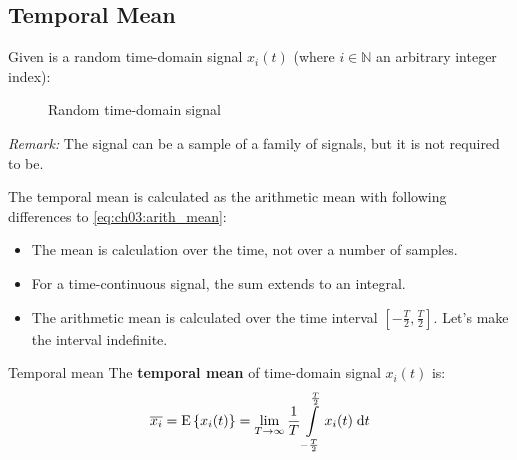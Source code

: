 \begin{refsection}
\subsection{Temporal Mean}

Given is a random time-domain signal $x_i(t)$ (where $i \in \mathbb{N}$ an arbitrary integer index):

\begin{figure}[H]
	\centering
	\caption{Random time-domain signal}
\end{figure}

\textit{Remark:} The signal can be a sample of a family of signals, but it is not required to be.

The temporal mean is calculated as the arithmetic mean with following differences to \eqref{eq:ch03:arith_mean}:
\begin{itemize}
	\item The mean is calculation over the time, not over a number of samples.
	\item For a time-continuous signal, the sum extends to an integral.
	\item The arithmetic mean is calculated over the time interval $[-\frac{T}{2}, \frac{T}{2}]$. Let's make the interval indefinite.
\end{itemize}

\begin{definition}{Temporal mean}
	The  \textbf{temporal mean} of time-domain signal $x_i(t)$ is:
	\begin{equation}
		\overline{x_i} = \mathrm{E}\left\{x_i(t)\right\} = \lim\limits_{T \rightarrow \infty} \frac{1}{T} \int\limits_{-\frac{T}{2}}^{\frac{T}{2}} x_i(t) \; \mathrm{d} t
	\end{equation}%
\end{definition}


\end{refsection}
